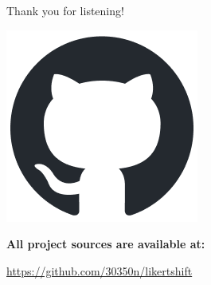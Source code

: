\documentclass[
    english,
    accentcolor=9c,
    design=2023,
    logofile=images/hulogo.pdf,
]{tudabeamer}
\begin{document}
\begin{frame}{Thank you for listening!}
    \large
    \centering

    \vspace*{2.5em}
    \includegraphics[height=0.175\linewidth]{images/github-mark.png}

    \vspace*{1em}
    \textbf{All project sources are available at:}

    \vspace*{0.5em}
    \url{https://github.com/30350n/likertshift}

\end{frame}
\end{document}

